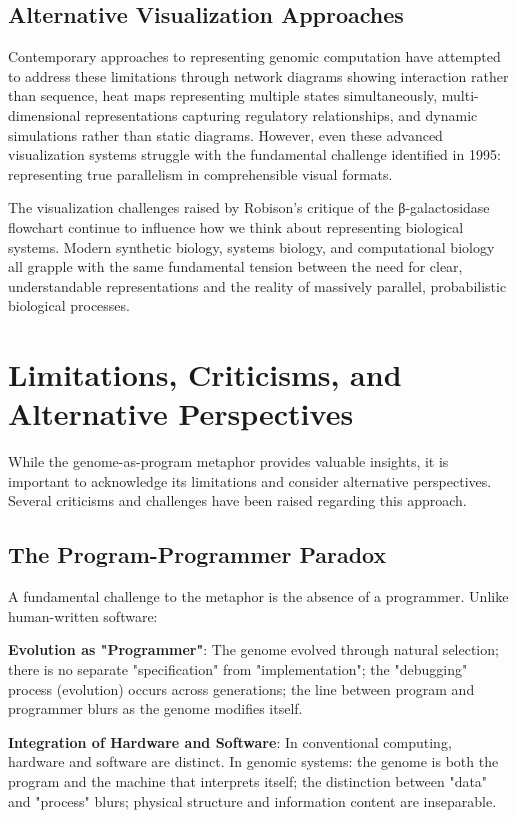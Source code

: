 \documentclass[11pt]{article}
\begin{document}
\subsection{Alternative Visualization Approaches}

Contemporary approaches to representing genomic computation have attempted to address these limitations through network diagrams showing interaction rather than sequence, heat maps representing multiple states simultaneously, multi-dimensional representations capturing regulatory relationships, and dynamic simulations rather than static diagrams. However, even these advanced visualization systems struggle with the fundamental challenge identified in 1995: representing true parallelism in comprehensible visual formats.

The visualization challenges raised by Robison's critique of the β-galactosidase flowchart continue to influence how we think about representing biological systems. Modern synthetic biology, systems biology, and computational biology all grapple with the same fundamental tension between the need for clear, understandable representations and the reality of massively parallel, probabilistic biological processes.

\section{Limitations, Criticisms, and Alternative Perspectives}

While the genome-as-program metaphor provides valuable insights, it is important to acknowledge its limitations and consider alternative perspectives. Several criticisms and challenges have been raised regarding this approach.

\subsection{The Program-Programmer Paradox}

A fundamental challenge to the metaphor is the absence of a programmer. Unlike human-written software:

\textbf{Evolution as "Programmer"}: The genome evolved through natural selection; there is no separate "specification" from "implementation"; the "debugging" process (evolution) occurs across generations; the line between program and programmer blurs as the genome modifies itself.

\textbf{Integration of Hardware and Software}: In conventional computing, hardware and software are distinct. In genomic systems: the genome is both the program and the machine that interprets itself; the distinction between "data" and "process" blurs; physical structure and information content are inseparable.
\end{document}
